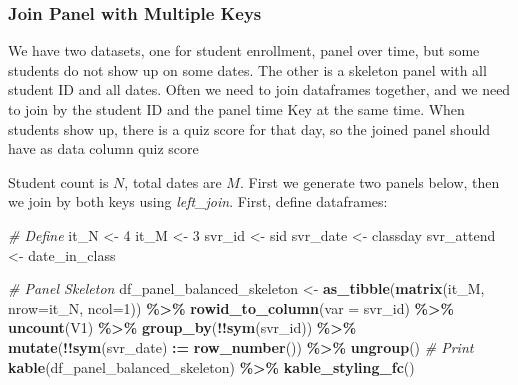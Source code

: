 \documentclass[
]{book}
\newenvironment{Shaded}{\begin{snugshade}}{\end{snugshade}}
\newcommand{\CommentTok}[1]{\textcolor[rgb]{0.56,0.35,0.01}{\textit{#1}}}
\newcommand{\DataTypeTok}[1]{\textcolor[rgb]{0.13,0.29,0.53}{#1}}
\newcommand{\DecValTok}[1]{\textcolor[rgb]{0.00,0.00,0.81}{#1}}
\newcommand{\ErrorTok}[1]{\textcolor[rgb]{0.64,0.00,0.00}{\textbf{#1}}}
\newcommand{\KeywordTok}[1]{\textcolor[rgb]{0.13,0.29,0.53}{\textbf{#1}}}
\newcommand{\NormalTok}[1]{#1}
\newcommand{\OperatorTok}[1]{\textcolor[rgb]{0.81,0.36,0.00}{\textbf{#1}}}
\newcommand{\StringTok}[1]{\textcolor[rgb]{0.31,0.60,0.02}{#1}}
\begin{document}
\hypertarget{join-panel-with-multiple-keys}{%
\subsubsection{Join Panel with Multiple Keys}\label{join-panel-with-multiple-keys}}

We have two datasets, one for student enrollment, panel over time, but some students do not show up on some dates. The other is a skeleton panel with all student ID and all dates. Often we need to join dataframes together, and we need to join by the student ID and the panel time Key at the same time. When students show up, there is a quiz score for that day, so the joined panel should have as data column quiz score

Student count is \(N\), total dates are \(M\). First we generate two panels below, then we join by both keys using \emph{left\_join}. First, define dataframes:

\begin{Shaded}
\begin{Highlighting}[]
\CommentTok{\# Define}
\NormalTok{it\_N \textless{}{-}}\StringTok{ }\DecValTok{4}
\NormalTok{it\_M \textless{}{-}}\StringTok{ }\DecValTok{3}
\NormalTok{svr\_id \textless{}{-}}\StringTok{ \textquotesingle{}sid\textquotesingle{}}
\NormalTok{svr\_date \textless{}{-}}\StringTok{ \textquotesingle{}classday\textquotesingle{}}
\NormalTok{svr\_attend \textless{}{-}}\StringTok{ \textquotesingle{}date\_in\_class\textquotesingle{}}

\CommentTok{\# Panel Skeleton}
\NormalTok{df\_panel\_balanced\_skeleton \textless{}{-}}\StringTok{ }\KeywordTok{as\_tibble}\NormalTok{(}\KeywordTok{matrix}\NormalTok{(it\_M, }\DataTypeTok{nrow=}\NormalTok{it\_N, }\DataTypeTok{ncol=}\DecValTok{1}\NormalTok{)) }\OperatorTok{\%\textgreater{}\%}
\StringTok{  }\KeywordTok{rowid\_to\_column}\NormalTok{(}\DataTypeTok{var =}\NormalTok{ svr\_id) }\OperatorTok{\%\textgreater{}\%}
\StringTok{  }\KeywordTok{uncount}\NormalTok{(V1) }\OperatorTok{\%\textgreater{}\%}
\StringTok{  }\KeywordTok{group\_by}\NormalTok{(}\OperatorTok{!!}\KeywordTok{sym}\NormalTok{(svr\_id)) }\OperatorTok{\%\textgreater{}\%}\StringTok{ }\KeywordTok{mutate}\NormalTok{(}\OperatorTok{!!}\KeywordTok{sym}\NormalTok{(svr\_date) }\OperatorTok{:}\ErrorTok{=}\StringTok{ }\KeywordTok{row\_number}\NormalTok{()) }\OperatorTok{\%\textgreater{}\%}
\StringTok{  }\KeywordTok{ungroup}\NormalTok{()}
\CommentTok{\# Print}
\KeywordTok{kable}\NormalTok{(df\_panel\_balanced\_skeleton) }\OperatorTok{\%\textgreater{}\%}
\StringTok{  }\KeywordTok{kable\_styling\_fc}\NormalTok{()}
\end{Highlighting}
\end{Shaded}
\end{document}
